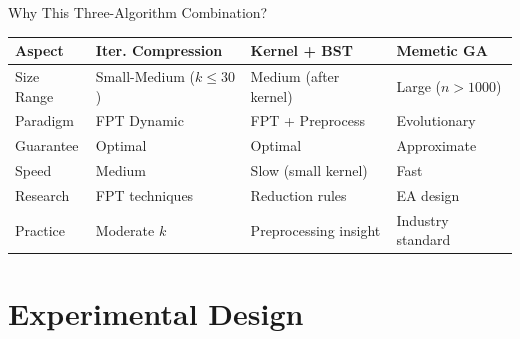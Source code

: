 \documentclass[aspectratio=169]{beamer}
\begin{document}
\begin{frame}{Why This Three-Algorithm Combination?}
	\begin{table}
		\footnotesize
		\begin{tabular}{@{}lp{2.8cm}p{2.8cm}p{2.8cm}@{}}
			\toprule
			\textbf{Aspect} & \textbf{Iter. Compression} & \textbf{Kernel + BST} & \textbf{Memetic GA} \\
			\midrule
			Size Range      & Small-Medium ($k \leq 30$) & Medium (after kernel) & Large ($n > 1000$)  \\
			\midrule
			Paradigm        & FPT Dynamic                & FPT + Preprocess      & Evolutionary        \\
			\midrule
			Guarantee       & Optimal                    & Optimal               & Approximate         \\
			\midrule
			Speed           & Medium                     & Slow (small kernel)   & Fast                \\
			\midrule
			Research        & FPT techniques             & Reduction rules       & EA design           \\
			\midrule
			Practice        & Moderate $k$               & Preprocessing insight & Industry standard   \\
			\bottomrule
		\end{tabular}
	\end{table}


\end{frame}




\section{Experimental Design}
\end{document}
